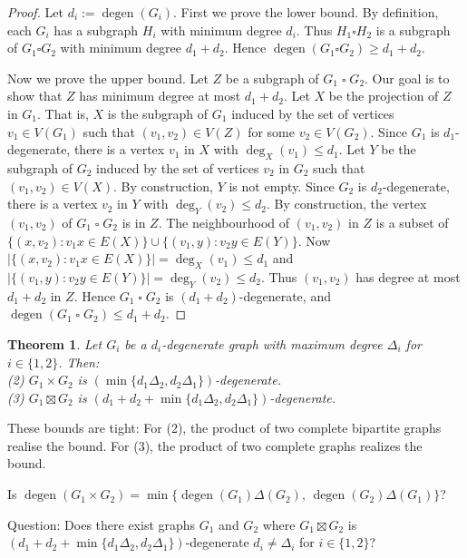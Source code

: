 \documentclass[a4paper,11pt]{article}
\theoremstyle{plain}
\newtheorem{thm}{Theorem}
\theoremstyle{definition}
\DeclareMathOperator{\degen}{degen}
\renewcommand{\leq}{\leqslant}
\renewcommand{\geq}{\geqslant}
\newcommand{\CartProd}{\mathbin{\square}}
\begin{document}
\begin{proof}
	Let $d_i := \degen(G_i)$. 
	First we prove the lower bound. By definition, each $G_i$ has a subgraph $H_i$ with minimum degree $d_i$. Thus $H_1\square H_2$ is a subgraph of $G_1\square G_2$ with minimum degree $d_1+d_2$. Hence $\degen(G_1\square G_2) \geq d_1+d_2$. 
	
	Now we prove the upper bound. 
	Let $Z$ be a subgraph of $G_1\CartProd G_2$. 
	Our goal is to show that $Z$ has minimum degree at most $d_1+d_2$. 
	Let $X$ be the projection of $Z$ in $G_1$. 
	That is, $X$ is the subgraph of $G_1$ induced by the set of vertices $v_1\in V(G_1)$ such that $(v_1,v_2)\in V(Z)$ for some $v_2\in V(G_2)$. 
	Since $G_1$ is $d_1$-degenerate, there is a vertex $v_1$ in $X$ with $\deg_X(v_1)\leq d_1$. 
	Let $Y$ be the subgraph of $G_2$ induced by the set of vertices $v_2$ in $G_2$ such that $(v_1,v_2)\in V(X)$. 
	By construction, $Y$ is not empty. 
	Since $G_2$ is $d_2$-degenerate, there is a vertex $v_2$ in $Y$ with $\deg_Y(v_2)\leq d_2$. 
	By construction, the vertex $(v_1,v_2)$ of $G_1\CartProd G_2$ is in $Z$. 
	The neighbourhood of $(v_1,v_2)$ in $Z$ is a subset of 
	$\{ (x,v_2): v_1x\in E(X)\} \cup \{(v_1,y): v_2y\in E(Y)\}$. 
	Now $|\{ (x,v_2): v_1x\in E(X)\}| = \deg_X(v_1) \leq d_1$ and
	$|\{(v_1,y): v_2y\in E(Y)\} | =  \deg_Y(v_2) \leq d_2$. 
	Thus $(v_1,v_2)$ has degree at most $d_1+d_2$ in $Z$. 
	Hence $G_1\CartProd G_2$ is $(d_1+d_2)$-degenerate, and $\degen(G_1\CartProd G_2)\leq d_1+d_2$. 
\end{proof}




\begin{thm}
	Let $G_i$ be a $d_i$-degenerate graph with maximum degree $\Delta_i$ for $i\in\{1,2\}$. Then:\\
	(2) $G_1 \times G_2$ is $(\min{\{d_1\Delta_2,d_2\Delta_1\}})$-degenerate.\\
	(3) $G_1 \boxtimes G_2$ is $(d_1+d_2+\min{\{d_1\Delta_2,d_2\Delta_1\}})$-degenerate.
\end{thm}


These bounds are tight: For (2), the product of two complete bipartite graphs realise the bound. For (3), the product of two complete graphs realizes the bound. 

Is $\degen( G_1 \times G_2 ) = \min\{ \degen(G_1) \Delta(G_2),\,\degen(G_2)\Delta(G_1)\}$?


Question: Does there exist graphs $G_1$ and $G_2$ where $G_1 \boxtimes G_2$ is $(d_1+d_2+\min{\{d_1\Delta_2,d_2\Delta_1\}})$-degenerate $d_i \neq  \Delta_i$ for $i \in \{1,2\}$?
\end{document}
